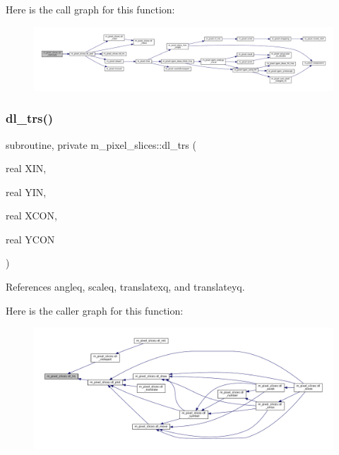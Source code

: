 Here is the call graph for this function\+:\nopagebreak
\begin{figure}[H]
\begin{center}
\leavevmode
\includegraphics[width=350pt]{namespacem__pixel__slices_ad35fa14bd29e8e895f22de6500b6b5ff_cgraph}
\end{center}
\end{figure}
\mbox{\label{namespacem__pixel__slices_a141b4da9ce5a0d633cc488f656c0320d}} 
\subsubsection{\texorpdfstring{dl\+\_\+trs()}{dl\_trs()}}
{\footnotesize\ttfamily subroutine, private m\+\_\+pixel\+\_\+slices\+::dl\+\_\+trs (\begin{DoxyParamCaption}\item[{real}]{X\+IN,  }\item[{real}]{Y\+IN,  }\item[{real}]{X\+C\+ON,  }\item[{real}]{Y\+C\+ON }\end{DoxyParamCaption})\hspace{0.3cm}{\ttfamily [private]}}



References angleq, scaleq, translatexq, and translateyq.

Here is the caller graph for this function\+:\nopagebreak
\begin{figure}[H]
\begin{center}
\leavevmode
\includegraphics[width=350pt]{namespacem__pixel__slices_a141b4da9ce5a0d633cc488f656c0320d_icgraph}
\end{center}
\end{figure}
\mbox{\label{namespacem__pixel__slices_a87a664883c6c5e0e2812df4d1ea29515}} 
